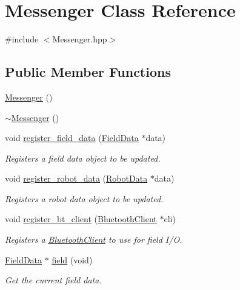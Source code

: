 \hypertarget{class_messenger}{}\section{Messenger Class Reference}
\label{class_messenger}


{\ttfamily \#include $<$Messenger.\+hpp$>$}

\subsection*{Public Member Functions}
\begin{DoxyCompactItemize}
\item 
\hyperlink{class_messenger_a6e49006efdfa500349b30bdc492ba2ab}{Messenger} ()
\item 
\hyperlink{class_messenger_a9fd6bc17fefe8105c01fc57e8abb5773}{$\sim$\+Messenger} ()
\item 
void \hyperlink{class_messenger_a1416b79fce99fd7b1aa13d07113546a7}{register\+\_\+field\+\_\+data} (\hyperlink{class_field_data}{Field\+Data} $\ast$data)
\begin{DoxyCompactList}\small\item\em Registers a field data object to be updated. \end{DoxyCompactList}\item 
void \hyperlink{class_messenger_ade23d550433aaa39bd08b4dd092bceeb}{register\+\_\+robot\+\_\+data} (\hyperlink{class_robot_data}{Robot\+Data} $\ast$data)
\begin{DoxyCompactList}\small\item\em Registers a robot data object to be updated. \end{DoxyCompactList}\item 
void \hyperlink{class_messenger_a8412ddd8931fa6b49a2ad3a2f52cad31}{register\+\_\+bt\+\_\+client} (\hyperlink{class_bluetooth_client}{Bluetooth\+Client} $\ast$cli)
\begin{DoxyCompactList}\small\item\em Registers a \hyperlink{class_bluetooth_client}{Bluetooth\+Client} to use for field I/O. \end{DoxyCompactList}\item 
\hyperlink{class_field_data}{Field\+Data} $\ast$ \hyperlink{class_messenger_a2d8c23fd3eada41d734620a600ceca57}{field} (void)
\begin{DoxyCompactList}\small\item\em Get the current field data. \end{DoxyCompactList}\item 

\end{DoxyCompactItemize}
